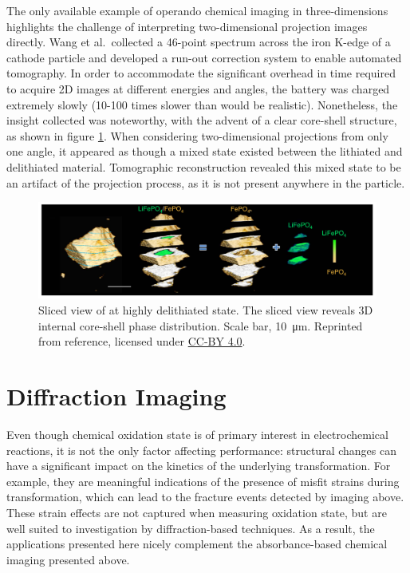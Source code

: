 \documentclass[journal=cmatex,manuscript=perspective]{achemso}
\begin{document}
The only available example of operando chemical imaging in
three-dimensions highlights the challenge of interpreting
two-dimensional projection images directly. Wang et al.\ collected a
46-point spectrum across the iron K-edge of a  cathode
particle and developed a run-out correction system to enable automated
tomography. In order to accommodate the significant overhead in time
required to acquire 2D images at different energies and angles, the
battery was charged extremely slowly (10-100 times slower than would
be realistic). Nonetheless, the insight collected was noteworthy, with
the advent of a clear core-shell structure, as shown in figure
\ref{figure:wang2016}. When considering two-dimensional projections
from only one angle, it appeared as though a mixed state existed
between the lithiated and delithiated material. Tomographic
reconstruction revealed this mixed state to be an artifact of the
projection process, as it is not present anywhere in the
particle\cite{wang2016}.

\begin{figure}
  \includegraphics[width=\textwidth]{wang2016.png}
  \caption{Sliced view of  at highly delithiated
    state. The sliced view reveals 3D internal core-shell phase
    distribution. Scale bar, \SI{10}{\micro\metre}. Reprinted from
    reference\cite{wang2016}, licensed under
    \href{https://creativecommons.org/licenses/by/4.0/}{CC-BY 4.0}.}
  \label{figure:wang2016}
\end{figure}

\section{Diffraction Imaging}

Even though chemical oxidation state is of primary interest in
electrochemical reactions, it is not the only factor affecting
performance: structural changes can have a significant impact on the
kinetics of the underlying transformation. For example, they are
meaningful indications of the presence of misfit strains during
transformation, which can lead to the fracture events detected by
imaging above\cite{woodford2012}.
These strain effects are not captured when measuring oxidation state,
but are well suited to investigation by diffraction-based
techniques. As a result, the applications presented here nicely
complement the absorbance-based chemical imaging presented above.
\end{document}
